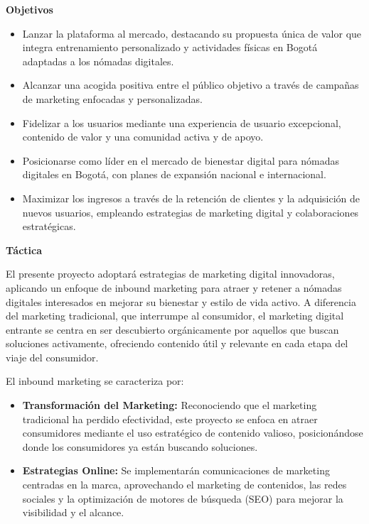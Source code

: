 {\textbf{Objetivos}
\begin{itemize}
    \item Lanzar la plataforma al mercado, destacando su propuesta única de valor que integra entrenamiento personalizado y actividades físicas en Bogotá adaptadas a los nómadas digitales.
    \item Alcanzar una acogida positiva entre el público objetivo a través de campañas de marketing enfocadas y personalizadas.
    \item Fidelizar a los usuarios mediante una experiencia de usuario excepcional, contenido de valor y una comunidad activa y de apoyo.
    \item Posicionarse como líder en el mercado de bienestar digital para nómadas digitales en Bogotá, con planes de expansión nacional e internacional.
    \item Maximizar los ingresos a través de la retención de clientes y la adquisición de nuevos usuarios, empleando estrategias de marketing digital y colaboraciones estratégicas.
\end{itemize}

\textbf{Táctica}

El presente proyecto adoptará estrategias de marketing digital innovadoras, aplicando un enfoque de inbound marketing para atraer y retener a nómadas digitales interesados en mejorar su bienestar y estilo de vida activo. A diferencia del marketing tradicional, que interrumpe al consumidor, el marketing digital entrante se centra en ser descubierto orgánicamente por aquellos que buscan soluciones activamente, ofreciendo contenido útil y relevante en cada etapa del viaje del consumidor. \cite{Opreana2015}

El inbound marketing se caracteriza por:

\begin{itemize}
    \item \textbf{Transformación del Marketing:} Reconociendo que el marketing tradicional ha perdido efectividad, este proyecto se enfoca en atraer consumidores mediante el uso estratégico de contenido valioso, posicionándose donde los consumidores ya están buscando soluciones.
    
    \item \textbf{Estrategias Online:} Se implementarán comunicaciones de marketing centradas en la marca, aprovechando el marketing de contenidos, las redes sociales y la optimización de motores de búsqueda (SEO) para mejorar la visibilidad y el alcance.
    

\end{itemize}}
